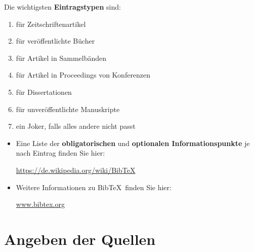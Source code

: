\begin{frame}[fragile]


Die wichtigsten \textbf{Eintragstypen} sind:

\begin{enumerate}
	\item \textbf{} für Zeitschriftenartikel
	\item \textbf{} für veröffentlichte Bücher
	\item \textbf{} für Artikel in Sammelbänden
	\item \textbf{} für Artikel in Proceedings von Konferenzen
	\item \textbf{} für Dissertationen
	\item \textbf{} für unveröffentlichte Manuskripte
	\item \textbf{} ein Joker, falls alles andere nicht passt
\end{enumerate}

\pause 

\begin{itemize}
	\item Eine Liste der \textbf{obligatorischen} und \textbf{optionalen Informationspunkte} je nach Eintrag finden Sie hier:
	
	\url{https://de.wikipedia.org/wiki/BibTeX}
	
	\item Weitere Informationen zu Bib\TeX\ finden Sie hier:
	
	\url{www.bibtex.org}
\end{itemize}

\end{frame}


\section{Angeben der Quellen}

